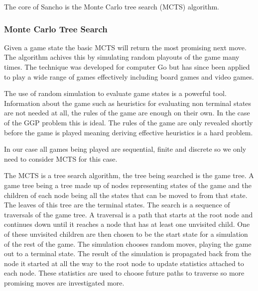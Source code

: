 \documentclass[a4paper,12pt]{report}
\begin{document}
The core of Sancho is the Monte Carlo tree search (MCTS) algorithm.

\subsubsection{Monte Carlo Tree Search}
Given a game state the basic MCTS will return the most promising next move. The algorithm achives this by simulating random playouts of the game many times. The technique was developed for computer Go but has since been applied to play a wide range of games effectively including board games and video games\cite{Silver/MCTS}\cite{Chaslot/MCTS}. 

The use of random simulation to evaluate game states is a powerful tool. Information about the game such as heuristics for evaluating non terminal states are not needed at all, the rules of the game are enough on their own. In the case of the GGP problem this is ideal. The rules of the game are only revealed shortly before the game is played meaning deriving effective heuristics is a hard problem. 

In our case all games being played are sequential, finite and discrete so we only need to consider MCTS for this case.

The MCTS is a tree search algorithm, the tree being searched is the game tree. A game tree being a tree made up of nodes representing states of the game and the children of each node being all the states that can be moved to from that state. The leaves of this tree are the terminal states. The search is a sequence of traversals of the game tree. A traversal is a path that starts at the root node and continues down until it reaches a node that has at least one unvisited child. One of these unvisited children are then chosen to be the start state for a simulation of the rest of the game. The simulation chooses random moves, playing the game out to a terminal state. The result of the simulation is propagated back from the node it started at all the way to the root node to update statistics attached to each node. These statistics are used to choose future paths to traverse so more promising moves are investigated more.
\end{document}

